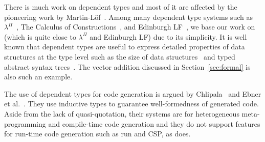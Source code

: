 
There is much work on dependent types and most of it are affected by
the pioneering work by Martin-L\"{o}f~\cite{martin1973intuitionistic}.
Among many dependent type systems such as
$\lambda^\Pi$~\cite{Meyer1986}, The Calculus of
Constructions~\cite{coquand:inria-00076024}, and Edinburgh
LF~\cite{harper1993framework}, we base our work on \LLF~\cite{attapl}
(which is quite close to $\lambda^\Pi$ and Edinburgh LF) due to its
simplicity.  It is well known that dependent types are useful to
express detailed properties of data structures at the type level such
as the size of data structures~\cite{Xi98} and typed abstract syntax
trees~\cite{DBLP:conf/dsl/LeijenM99,DBLP:conf/popl/XiCC03}.  The
vector addition discussed in Section~\ref{sec:formal} is also such an
example.






The use of dependent types for code generation is argued by
Chlipala~\cite{chlipala2010ur} and Ebner et
al.~\cite{DBLP:journals/pacmpl/EbnerURAM17}.  They use inductive types
to guarantee well-formedness of generated code.  Aside from the lack
of quasi-quotation, their systems are for heterogeneous
meta-programming and compile-time code generation and they do not
support features for run-time code generation such as run and CSP, as \LMD{} does.

